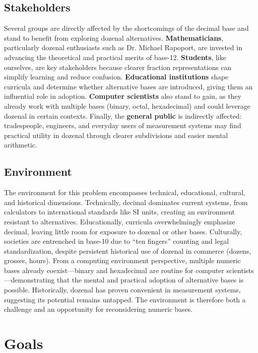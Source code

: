 \documentclass{article}
\begin{document}
    \subsection{Stakeholders}
    Several groups are directly affected by the shortcomings of the decimal base and 
    stand to benefit from exploring dozenal alternatives. \textbf{Mathematicians}, 
    particularly dozenal enthusiasts such as Dr. Michael Rapoport, are invested in 
    advancing the theoretical and practical merits of base-12. \textbf{Students}, like 
    ourselves, are key stakeholders because clearer fraction representations can simplify 
    learning and reduce confusion. \textbf{Educational institutions} shape curricula 
    and determine whether alternative bases are introduced, giving them an influential 
    role in adoption. \textbf{Computer scientists} also stand to gain, as they already 
    work with multiple bases (binary, octal, hexadecimal) and could leverage dozenal in 
    certain contexts. Finally, the \textbf{general public} is indirectly affected: 
    tradespeople, engineers, and everyday users of measurement systems may find practical 
    utility in dozenal through clearer subdivisions and easier mental arithmetic.

    \subsection{Environment}
    The environment for this problem encompasses technical, educational, cultural, and 
    historical dimensions. Technically, decimal dominates current systems, from calculators 
    to international standards like SI units, creating an environment resistant to 
    alternatives. Educationally, curricula overwhelmingly emphasize decimal, leaving little 
    room for exposure to dozenal or other bases. Culturally, societies are entrenched in 
    base-10 due to “ten fingers” counting and legal standardization, despite persistent 
    historical use of dozenal in commerce (dozens, grosses, hours). From a computing 
    environment perspective, multiple numeric bases already coexist—binary and hexadecimal 
    are routine for computer scientists—demonstrating that the mental and practical adoption 
    of alternative bases is possible. Historically, dozenal has proven convenient in 
    measurement systems, suggesting its potential remains untapped. The environment is 
    therefore both a challenge and an opportunity for reconsidering numeric bases.

    \section{Goals}
\end{document}
